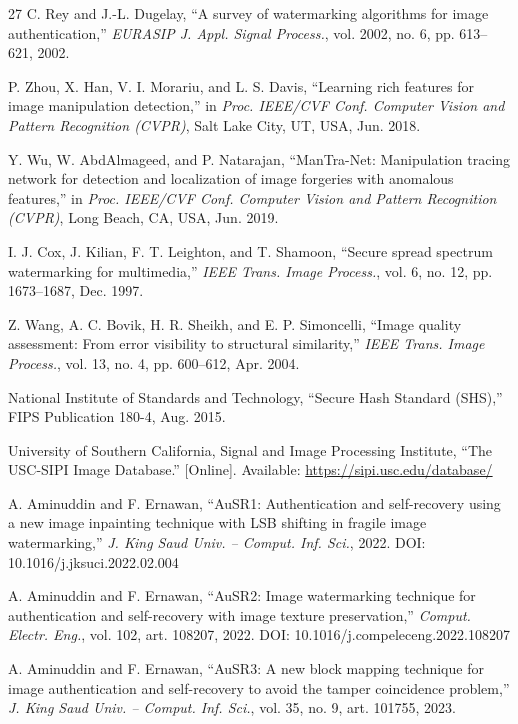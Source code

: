 \begin{thebibliography}{27}
 C. Rey and J.-L. Dugelay, ``A survey of watermarking algorithms for image authentication,'' \emph{EURASIP J. Appl. Signal Process.}, vol. 2002, no. 6, pp. 613--621, 2002.

 P. Zhou, X. Han, V. I. Morariu, and L. S. Davis, ``Learning rich features for image manipulation detection,'' in \emph{Proc. IEEE/CVF Conf. Computer Vision and Pattern Recognition (CVPR)}, Salt Lake City, UT, USA, Jun. 2018.

 Y. Wu, W. AbdAlmageed, and P. Natarajan, ``ManTra-Net: Manipulation tracing network for detection and localization of image forgeries with anomalous features,'' in \emph{Proc. IEEE/CVF Conf. Computer Vision and Pattern Recognition (CVPR)}, Long Beach, CA, USA, Jun. 2019.

 I. J. Cox, J. Kilian, F. T. Leighton, and T. Shamoon, ``Secure spread spectrum watermarking for multimedia,'' \emph{IEEE Trans. Image Process.}, vol. 6, no. 12, pp. 1673--1687, Dec. 1997.

 Z. Wang, A. C. Bovik, H. R. Sheikh, and E. P. Simoncelli, ``Image quality assessment: From error visibility to structural similarity,'' \emph{IEEE Trans. Image Process.}, vol. 13, no. 4, pp. 600--612, Apr. 2004.

 National Institute of Standards and Technology, ``Secure Hash Standard (SHS),'' FIPS Publication 180-4, Aug. 2015.

 University of Southern California, Signal and Image Processing Institute, ``The USC-SIPI Image Database.'' [Online]. Available: \url{https://sipi.usc.edu/database/}

 A. Aminuddin and F. Ernawan, ``AuSR1: Authentication and self-recovery using a new image inpainting technique with LSB shifting in fragile image watermarking,'' \emph{J. King Saud Univ. -- Comput. Inf. Sci.}, 2022. DOI: 10.1016/j.jksuci.2022.02.004

 A. Aminuddin and F. Ernawan, ``AuSR2: Image watermarking technique for authentication and self-recovery with image texture preservation,'' \emph{Comput. Electr. Eng.}, vol. 102, art. 108207, 2022. DOI: 10.1016/j.compeleceng.2022.108207

 A. Aminuddin and F. Ernawan, ``AuSR3: A new block mapping technique for image authentication and self-recovery to avoid the tamper coincidence problem,'' \emph{J. King Saud Univ. -- Comput. Inf. Sci.}, vol. 35, no. 9, art. 101755, 2023.


\end{thebibliography}
